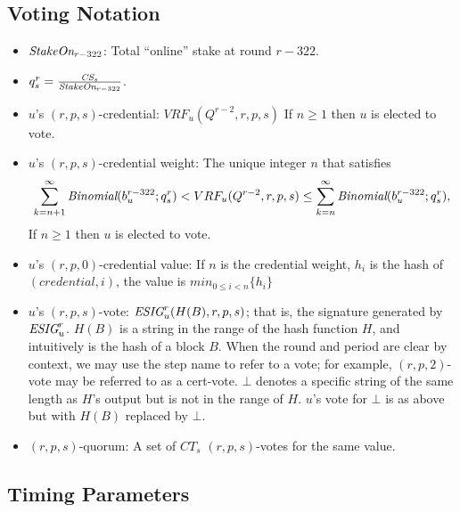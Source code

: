 \documentclass[../main.tex]{subfiles}
\begin{document}
\subsection{Voting Notation}
\begin{itemize}

\item $\textit{StakeOn}_{r-322}$: Total ``online'' stake at round $r-322$.

\item $q^r_s = \frac{\textit{CS}_s}{\textit{StakeOn}_{r-322}}$.

\item $u$'s $(r,p,s)$-credential: $VRF_u(Q^{r-2},r,p,s)$
If $n\geq 1$ then $u$ is elected to vote.

\item $u$'s $(r,p,s)$-credential weight: The unique integer $n$ that satisfies
\[
\sum_{k=n+1}^\infty \textit{Binomial}(b_u^{r-322};q^r_s) < VRF_u(Q^{r-2},r,p,s) \\ 
\leq \sum_{k=n}^\infty \textit{Binomial}(b_u^{r-322};q^r_s),
\]
If $n\geq 1$ then $u$ is elected to vote.
    
\item $u$'s $(r,p,0)$-credential value: If $n$ is the credential weight, $h_i$ is the hash of $(credential,i)$, the value is $min_{0\leq i < n}\{h_i\}$
    
\item $u$'s $(r,p,s)$-vote: $\textit{ESIG}_u^r(H(B),r,p,s)$; that is, the signature generated by $\textit{ESIG}_u^r$.
$H(B)$ is a string in the range of the hash function $H$, and intuitively is the hash of a block $B$.
When the round and period are clear by context, we may use the step name to refer to a vote; for example, $(r,p,2)$-vote may be referred to as a cert-vote.
$\bot$ denotes a specific string of the same length as $H$'s output but is not in the range of $H$. $u$'s vote for $\bot$ is as above but with $H(B)$ replaced by $\bot$.
    
\item $(r,p,s)$-quorum: A set of $CT_s$ $(r,p,s)$-votes for the same value.
\end{itemize}

\subsection{Timing Parameters}
\label{subsection:TimingParameters}
\end{document}
